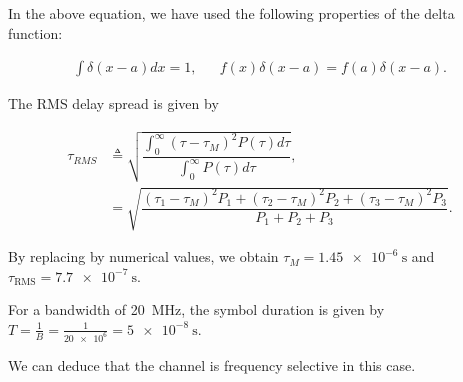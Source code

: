 \documentclass [a4paper, 11pt] {article}
\begin{document}
\begin{solution}
\begin{enumerate}
        In the above equation, we have used the following properties of the delta function:

        \begin{align}
            \int \delta(x-a) dx = 1, &&  f(x)\delta(x-a) = f(a)\delta(x-a).
        \end{align}


        The RMS delay spread is given by

        \begin{align}
        \tau_{RMS} &\triangleq \sqrt{\dfrac{\int_0^\infty (\tau - \tau_M)^2 P(\tau) d\tau}{\int_0^\infty P(\tau) d\tau}},\\
        &= \sqrt{\dfrac{(\tau_1 - \tau_M)^2P_1 + (\tau_2 - \tau_M)^2P_2 + (\tau_3 - \tau_M)^2P_3}{P_1+P_2+P_3}}.
        \end{align}
        \end{enumerate}


        By replacing by numerical values, we obtain $\tau_M = \SI{1.45e-6}{\second}$ and $\tau_{\text{RMS}} = \SI{7.7e-7}{\second}$.

        For a bandwidth of \SI{20}{\mega\hertz}, the symbol duration is given by $T=\frac{1}{B} = \frac{1}{\num{20e6}} = \SI{5e-8}{\second}$.

        We can deduce that the channel is frequency selective in this case.
    \end{solution}
\end{document}
